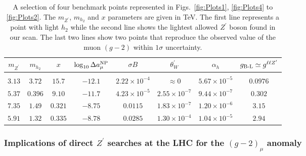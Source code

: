 \begin{table}[h]
	\begin{center}
		\begin{tabular}{cccccccc}
			$m_{Z^\prime}$ & $m_{h_2}$ &  $x$ & $ \log_{10} \Delta a_\mu^{\textrm{NP}}$ & $\sigma B$ & $\theta_W^\prime$ & $\alpha_h$ & $g_{\textrm{B-L}} \simeq g^{\ell \ell Z^\prime}$ \vspace{1mm}
			\\
			\hline \vspace{-2mm} \\ 
			$3.13$ 			    							& $3.72$ 			    				& $15.7$		& $-12.1$	&	$2.22\times 10^{-4}$ &	$\approx 0$ &	$5.67 \times 10^{-5}$ &	$0.0976$\vspace{1mm} 	\\
			$5.37$ 			    							& $0.396$ 			    				& $9.10$		& $-11.7$	&	$4.23 \times 10^{-5}$ &	$2.55 \times 10^{-7}$ &	$9.44 \times 10^{-7}$ &	$0.302$\vspace{1mm}  	\\
			$7.35$ 			    							& $1.49$ 			    				& $0.321$		& $-8.75$	&	$0.0115$ &	$1.83 \times 10^{-7}$ &	$1.20 \times 10^{-6}$ &	$3.15$\vspace{1mm}  	\\
			$5.91$ 			    							& $1.32$ 			    				& $0.335$		& $-8.78$	&	$0.0285$ &	$1.30 \times 10^{-4}$ &	$1.04 \times 10^{-5} $ &	$2.94$\vspace{1mm}  	\\
		\end{tabular}
		\caption{A selection of four benchmark points represented in Figs.~\ref{fig:Plots1}, \ref{fig:Plots4} to \ref{fig:Plots2}. The $m_{Z^\prime}$, $m_{h_2}$ and $x$ parameters are given in TeV. The first line represents a point with light $h_2$ while the second line shows the lightest allowed $Z^\prime$ boson found in our scan. The last two lines show two points that reproduce the observed value of the muon $(g-2)$ within $1\sigma$ uncertainty.}
		\label{tab:bench}
	\end{center}
\end{table}
% 
\subsubsection{Implications of direct $Z^\prime$ searches at the LHC for the $\left(g-2\right)_\mu$ anomaly}

